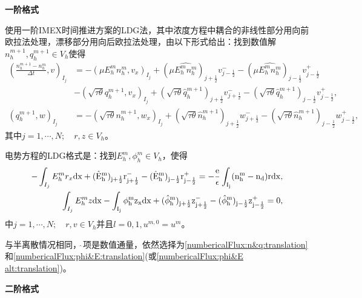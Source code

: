 \noindent \textbf{一阶格式}

使用一阶IMEX时间推进方案的LDG法，其中浓度方程中耦合的非线性部分用向前欧拉法处理，漂移部分用向后欧拉法处理，由以下形式给出：找到数值解$n_h^{m+1},q_h^{m+1}\in V_h$使得
\begin{align}
    (\frac{n_h^{m+1} - n_h^m}{\Delta t},v)_{I_j} & = -(\mu E_h^mn_h^m, v_x)_{I_j} + (\mu \hat{E_h^mn_h^m})_{j+\frac{1}{2}}v_{j-\frac{1}{2}}^- - (\mu\hat{E_h^mn_h^m})_{j-\frac{1}{2}}v^+_{j-\frac{1}{2}}                                         \nonumber                               \\
                                                 & -(\sqrt{\tau \theta}q_h^{m+1},v_x)_{I_j} + (\sqrt{\tau \theta}\hat{q}_h^{m+1})_{j+\frac{1}{2}}v_{j+\frac{1}{2}}^- - (\sqrt{\tau \theta}\hat{q}_h^{m+1})_{j-\frac{1}{2}}v_{j-\frac{1}{2}}^+,  \label{weakForm:IMEX1 LDG 1:translation} \\
    (q_h^{m+1},w)_{I_j}                          & = -(\sqrt{\tau \theta}n_h^{m+1},w_x)_{I_j} + (\sqrt{\tau \theta}\hat{n}_h^{m+1})_{j+\frac{1}{2}}w_{j+\frac{1}{2}}^- - (\sqrt{\tau \theta}\hat{n}_h^{m+1})_{j-\frac{1}{2}}w_{j-\frac{1}{2}}^+,\label{weakForm:IMEX1 LDG 2:translation}
\end{align}
其中$j = 1,\cdots,N;\quad r,z \in V_h$。

电势方程的LDG格式是：找到$E_h^{m},\phi_h^{m} \in V_h$，使得
\begin{align}
    -\int_{I_j} E_h^{m}r_x \rm{d}x + (\hat{E}_h^{m})_{j+\frac{1}{2}}r_{j+\frac{1}{2}}^- - (\hat{E}_h^{m})_{j-\frac{1}{2}}r_{j-\frac{1}{2}}^+ = -\frac{e}{\epsilon}\int_{I_j}(n_h^{m} - n_d) r\rm{d} x, \label{equation:IMEX1 LDG:EPE 1:translation} \\
    \int_{I_j} E_h^{m}z \rm{d}x - \int_{I_j} \phi_h^{m}z_x \rm{d}x  + (\hat{\phi}_h^{m})_{j+\frac{1}{2}}z^-_{j+\frac{1}{2}} - (\hat{\phi}_h^{m})_{j-\frac{1}{2}}z_{j-\frac{1}{2}}^+  = 0,\label{equation:IMEX1 LDG:EPE 2:translation}
\end{align}
中$j = 1,\cdots,N;\quad r,v \in V_h$并且$l = 0,1, u^{m,0} = u^m$。

与半离散情况相同，$\hat{\ }$项是数值通量，依然选择为\eqref{numbericalFlux:n&q:translation}和\eqref{numbericalFlux:phi&E:translation}(或\eqref{numbericalFlux:phi&E alt:translation})。

\noindent \textbf{二阶格式}


